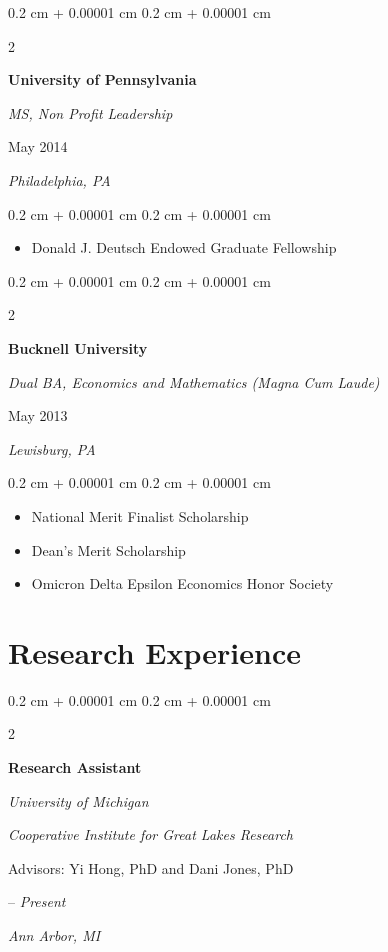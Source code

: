 \documentclass[11pt, letterpaper]{article}
\newenvironment{highlights}{
    \begin{itemize}[
        topsep=0.10 cm,
        parsep=0.10 cm,
        partopsep=0pt,
        itemsep=0pt,
        leftmargin=0.4 cm + 10pt
    ]
}{
    \end{itemize}
} %
\newenvironment{onecolentry}{
    \begin{adjustwidth}{
        0.2 cm + 0.00001 cm
    }{
        0.2 cm + 0.00001 cm
    }
}{
    \end{adjustwidth}
} %
\newenvironment{twocolentry}[2][]{
    \onecolentry
    \def\secondColumn{#2}
    \setcolumnwidth{\fill, 4.5 cm}
    \begin{paracol}{2}
}{
    \switchcolumn \raggedleft \secondColumn
    \end{paracol}
    \endonecolentry
} %
\begin{document}
\vspace{0.2 cm}
\begin{twocolentry}{
        May 2014

        \textit{Philadelphia, PA}
    }
    \textbf{University of Pennsylvania}

    \textit{MS, Non Profit Leadership}
\end{twocolentry}
\vspace{0.05 cm}
\begin{onecolentry}
    \begin{highlights}
        \item Donald J. Deutsch Endowed Graduate Fellowship
    \end{highlights}
\end{onecolentry}

\vspace{0.2 cm}
\begin{twocolentry}{
        May 2013

        \textit{Lewisburg, PA}
        }
    \textbf{Bucknell University}

    \textit{Dual BA, Economics and Mathematics (Magna Cum Laude)}
\end{twocolentry}
\vspace{0.05 cm}
\begin{onecolentry}
    \begin{highlights}
        \item National Merit Finalist Scholarship
        \item Dean's Merit Scholarship
        \item Omicron Delta Epsilon Economics Honor Society
    \end{highlights}
\end{onecolentry}


\section{Research Experience}

\begin{twocolentry}{2023 – \textit{Present}
    
    \textit{Ann Arbor, MI}
    }

    \textbf{Research Assistant}

    \textit{University of Michigan}

    \textit{Cooperative Institute for Great Lakes Research}

    Advisors: Yi Hong, PhD and Dani Jones, PhD
\end{twocolentry}
\end{document}
